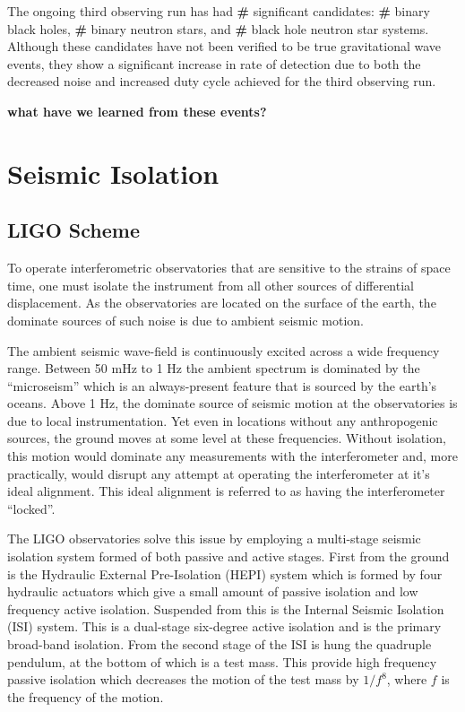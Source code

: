 \documentclass [12pt, proquest]{uwthesis}[2019]
\begin{document}
The ongoing third observing run has had \textbf{\#} significant candidates: \textbf{\#} binary black holes, \textbf{\#} binary neutron stars, and \textbf{\#} black hole neutron star systems. Although these candidates have not been verified to be true gravitational wave events, they show a significant increase in rate of detection due to both the decreased noise and increased duty cycle achieved for the third observing run.

\textbf{what have we learned from these events?}

\section{Seismic Isolation}

\subsection{LIGO Scheme}

To operate interferometric observatories that are sensitive to the strains of space time, one must isolate the instrument from all other sources of differential displacement. As the observatories are located on the surface of the earth, the dominate sources of such noise is due to ambient seismic motion. 

The ambient seismic wave-field is continuously excited across a wide frequency range. Between 50 mHz to 1 Hz the ambient spectrum is dominated by the ``microseism'' which is an always-present feature that is sourced by the earth's oceans. Above 1 Hz, the dominate source of seismic motion at the observatories is due to local instrumentation. Yet even in locations without any anthropogenic sources, the ground moves at some level at these frequencies. Without isolation, this motion would dominate any measurements with the interferometer and, more practically, would disrupt any attempt at operating the interferometer at it's ideal alignment. This ideal alignment is referred to as having the interferometer ``locked''.

The LIGO observatories solve this issue by employing a multi-stage seismic isolation system formed of both passive and active stages. First from the ground is the Hydraulic External Pre-Isolation (HEPI) system which is formed by four hydraulic actuators which give a small amount of passive isolation and low frequency active isolation. Suspended from this is the Internal Seismic Isolation (ISI) system. This is a dual-stage six-degree active isolation and is the primary broad-band isolation. From the second stage of the ISI is hung the quadruple pendulum, at the bottom of which is a test mass. This provide high frequency passive isolation which decreases the motion of the test mass by $1/f^8$, where $f$ is the frequency of the motion.
\end{document}

